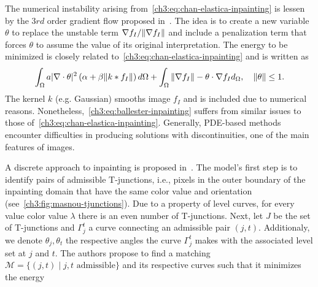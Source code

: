The numerical instability arising from~\cref{ch3:eq:chan-elastica-inpainting} is lessen by the $3rd$ order gradient flow proposed in~\cite{ballester01filling}. The idea is to create a new variable $\theta$ to replace the unstable term $\nabla f_I / \lVert\nabla f_I\rVert$ and include a penalization term that forces $\theta$ to assume the value of its original interpretation. The energy to be minimized is closely related to~\cref{ch3:eq:chan-elastica-inpainting} and is written as
\begin{align}
	\int_{\Omega}{a|\nabla \cdot \theta|^2\left(\alpha + \beta \lVert k * f_I\rVert\right)d\Omega} + \int_{\Omega}{ \lVert\nabla f_I\rVert - \theta \cdot \nabla f_I d_{\Omega}},\quad \lVert\theta\rVert \leq 1.
	\label{ch3:eq:ballester-inpainting}
\end{align}
%
The kernel $k$ (e.g. Gaussian) smooths image $f_I$ and is included due to numerical reasons. Nonetheless,~\cref{ch3:eq:ballester-inpainting} suffers from similar issues to those of~\cref{ch3:eq:chan-elastica-inpainting}. Generally, PDE-based methods encounter difficulties in producing solutions with discontinuities, one of the main features of images.

A discrete approach to inpainting is proposed in~\cite{masnou98inpainting}. The model's first step is to identify pairs of admissible T-junctions, i.e., pixels in the outer boundary of the inpainting domain that have the same color value and orientation (see~\cref{ch3:fig:masnou-tjunctions}). Due to a property of level curves, for every value color value $\lambda$ there is an even number of T-junctions. Next, let $J$ be the set of T-junctions and $\Gamma_j^t$ a curve connecting an admissible pair $(j,t)$. Additionaly, we denote $\theta_j,\theta_t$ the respective angles the curve $\Gamma_j^t$ makes with the associated level set at $j$ and $t$. The authors propose to find a matching $\mathcal{M}=\{ (j,t) \; | \; j,t\text{ admissible} \}$ and its respective curves such that it minimizes the energy

